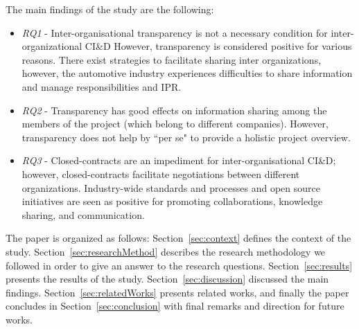 The main findings of the study are the following:
\begin{itemize}
\item {\em RQ1} - Inter-organisational transparency is not a necessary condition for inter-organizational CI\&D However, transparency is considered positive for various reasons. %
There exist strategies to facilitate sharing inter organizations, however, the automotive industry experiences difficulties to share information and manage responsibilities and IPR.
\item {\em RQ2} - Transparency has good effects on information sharing among the members of the project (which belong to different companies). However, transparency does not help by ``per se" to provide a holistic project overview.
\item {\em RQ3} - Closed-contracts are an impediment for inter-organisational CI\&D; however, closed-contracts facilitate negotiations between different organizations. Industry-wide standards and processes and open source initiatives are seen as positive for promoting collaborations, knowledge sharing, and communication.
\end{itemize}

%



The paper is organized as follows: Section~\ref{sec:context} defines the context of the study. Section~\ref{sec:researchMethod} describes the research methodology we followed in order to give an answer to the research questions. Section~\ref{sec:results} presents the results of the study. Section~\ref{sec:discussion} discussed the main findings. Section~\ref{sec:relatedWorks} presents related works, and finally the paper concludes in Section~\ref{sec:conclusion} with final remarks and direction for future works.